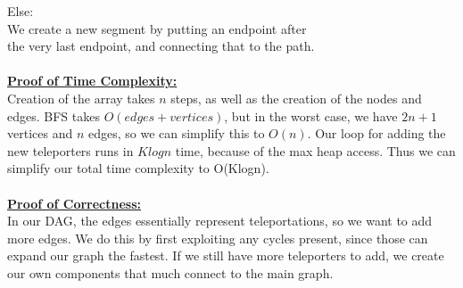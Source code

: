 \documentclass[10pt, letterpaper]{report}
\newcommand\tab[1][1cm]{\hspace*{#1}}
\begin{document}
\tab Else:\\
\tab\tab We create a new segment by putting an endpoint after\\
\tab\tab the very last endpoint, and connecting that to the path.\\
\\
\textbf{\underline{Proof of Time Complexity:}}\\
Creation of the array takes $n$ steps, as well as the creation of the nodes and edges. BFS takes $O(edges + vertices)$, but in the worst case, we have $2n+1$ vertices and $n$ edges, so we can simplify this to $O(n)$. Our loop for adding the new teleporters runs in $Klogn$ time, because of the max heap access. Thus we can simplify our total time complexity to O(Klogn).\\
\\
\textbf{\underline{Proof of Correctness:}}\\
In our DAG, the edges essentially represent teleportations, so we want to add more edges. We do this by first exploiting any cycles present, since those can expand our graph the fastest. If we still have more teleporters to add, we create our own components that much connect to the main graph.
\end{document}
